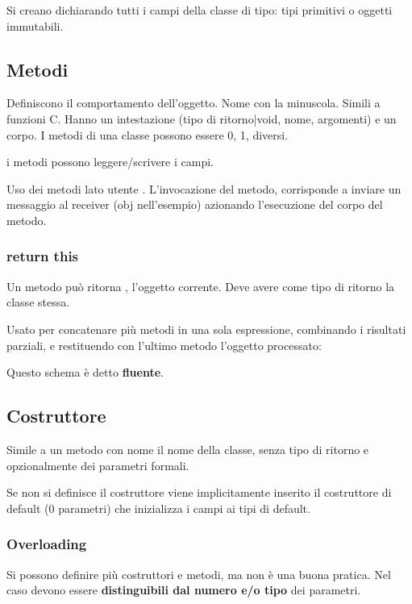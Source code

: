 Si creano dichiarando  tutti i campi della classe di tipo: tipi primitivi o oggetti immutabili.

\subsection{Metodi}
Definiscono il comportamento dell'oggetto. Nome con la minuscola.
Simili a funzioni C. Hanno un intestazione (tipo di ritorno|void, nome, argomenti) e un corpo.
I metodi di una classe possono essere 0, 1, diversi.

i metodi possono leggere/scrivere i campi.

Uso dei metodi lato utente . L'invocazione del metodo, corrisponde a inviare un messaggio al receiver (obj nell'esempio) azionando l'esecuzione del corpo del metodo.


\subsubsection{return this}
Un metodo può ritorna , l'oggetto corrente. Deve avere come tipo di ritorno la classe stessa.

Usato per concatenare più metodi in una sola espressione, combinando i risultati parziali, e restituendo con l'ultimo metodo l'oggetto processato:


Questo schema è detto \textbf{fluente}.

\subsection{Costruttore}
Simile a un metodo con nome il nome della classe, senza tipo di ritorno e opzionalmente dei parametri formali.


Se non si definisce il costruttore viene implicitamente inserito il costruttore di default (0 parametri) che inizializza i campi ai tipi di default.

\subsubsection{Overloading}
Si possono definire più costruttori e metodi, ma non è una buona pratica.
Nel caso devono essere \textbf{distinguibili dal numero e/o tipo} dei parametri.

